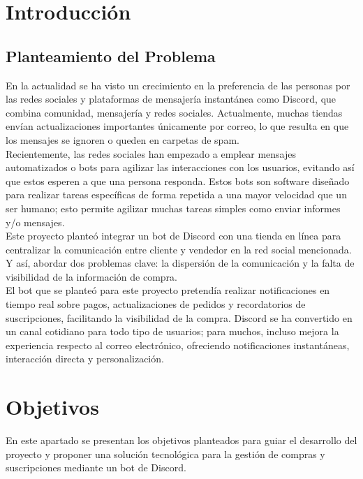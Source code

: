 \documentclass[a4paper,12pt]{article}
\begin{document}
\section{Introducción}
  
\newpage

\subsection{Planteamiento del Problema}

 En la actualidad se ha visto un crecimiento en la preferencia de las personas por las redes sociales y plataformas de mensajería instantánea como Discord, que combina comunidad, mensajería y redes sociales. Actualmente, muchas tiendas envían actualizaciones importantes únicamente por correo, lo que resulta en que los mensajes se ignoren o queden en carpetas de spam.\\

Recientemente, las redes sociales han empezado a emplear mensajes automatizados o bots para agilizar las interacciones con los usuarios, evitando así que estos esperen a que una persona responda. Estos bots son software diseñado para realizar tareas específicas de forma repetida a una mayor velocidad que un ser humano; esto permite agilizar muchas tareas simples como enviar informes y/o mensajes.\\

Este proyecto planteó integrar un bot de Discord con una tienda en línea para centralizar la comunicación entre cliente y vendedor en la red social mencionada. Y así, abordar dos problemas clave: la dispersión de la comunicación y la falta de visibilidad de la información de compra.\\
 
El bot que se planteó para este proyecto pretendía realizar notificaciones en tiempo real sobre pagos, actualizaciones de pedidos y recordatorios de suscripciones, facilitando la visibilidad de la compra. Discord se ha convertido en un canal cotidiano para todo tipo de usuarios; para muchos, incluso mejora la experiencia respecto al correo electrónico, ofreciendo notificaciones instantáneas, interacción directa y personalización.\\

\newpage

\section{Objetivos}
En este apartado se presentan los objetivos planteados para guiar el desarrollo del proyecto y proponer una solución tecnológica para la gestión de compras y suscripciones mediante un bot de Discord.
\end{document}
